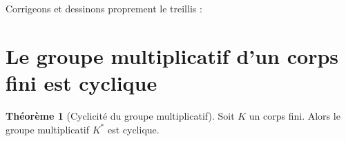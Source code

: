 \documentclass[12pt,a4paper,openany]{book}
\theoremstyle{definition}
\newtheorem{theoreme}{Théorème}[chapter]
\newcommand{\F}{\mathbb{F}}
\begin{document}
Corrigeons et dessinons proprement le treillis :

\begin{center}
\end{center}

\section{Le groupe multiplicatif d'un corps fini est cyclique}
\label{sec:multiplicatif-cyclique}

\begin{theoreme}[Cyclicité du groupe multiplicatif]\label{thm:multiplicatif-cyclique}
Soit $K$ un corps fini. Alors le groupe multiplicatif $K^*$ est cyclique.
\end{theoreme}
\end{document}
